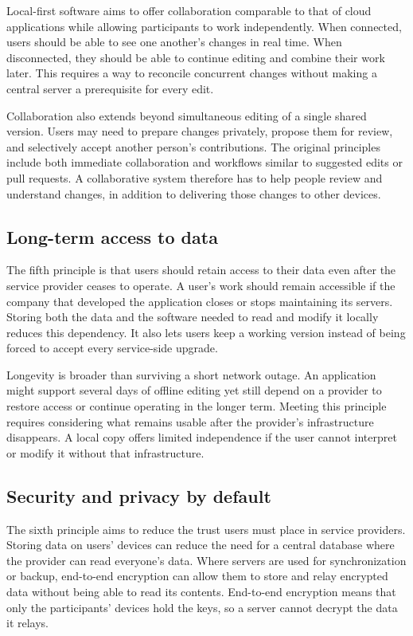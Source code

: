 Local-first software aims to offer collaboration comparable to that of cloud applications while allowing participants to work independently.
When connected, users should be able to see one another's changes in real time.
When disconnected, they should be able to continue editing and combine their work later.
This requires a way to reconcile concurrent changes without making a central server a prerequisite for every edit.
\parencite{local-first-software}

Collaboration also extends beyond simultaneous editing of a single shared version.
Users may need to prepare changes privately, propose them for review, and selectively accept another person's contributions.
The original principles include both immediate collaboration and workflows similar to suggested edits or pull requests.
A collaborative system therefore has to help people review and understand changes, in addition to delivering those changes to other devices.
\parencite{local-first-software}

\subsection{Long-term access to data}

The fifth principle is that users should retain access to their data even after the service provider ceases to operate.
A user's work should remain accessible if the company that developed the application closes or stops maintaining its servers.
Storing both the data and the software needed to read and modify it locally reduces this dependency.
It also lets users keep a working version instead of being forced to accept every service-side upgrade.
\parencite{local-first-software}

Longevity is broader than surviving a short network outage.
An application might support several days of offline editing yet still depend on a provider to restore access or continue operating in the longer term.
Meeting this principle requires considering what remains usable after the provider's infrastructure disappears.
A local copy offers limited independence if the user cannot interpret or modify it without that infrastructure.

\subsection{Security and privacy by default}

The sixth principle aims to reduce the trust users must place in service providers.
Storing data on users' devices can reduce the need for a central database where the provider can read everyone's data.
Where servers are used for synchronization or backup, end-to-end encryption can allow them to store and relay encrypted data without being able to read its contents.
End-to-end encryption means that only the participants' devices hold the keys, so a server cannot decrypt the data it relays.
\parencite{local-first-software}

